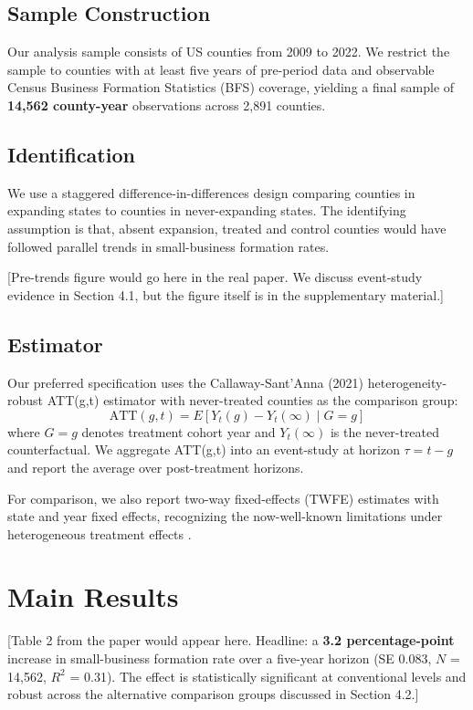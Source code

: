 \documentclass[11pt]{article}
\begin{document}
\subsection{Sample Construction}

Our analysis sample consists of US counties from 2009 to 2022. We restrict the sample to
counties with at least five years of pre-period data and observable Census Business
Formation Statistics (BFS) coverage, yielding a final sample of \textbf{14,562 county-year}
observations across 2,891 counties.

\subsection{Identification}

We use a staggered difference-in-differences design comparing counties in expanding states
to counties in never-expanding states. The identifying assumption is that, absent
expansion, treated and control counties would have followed parallel trends in
small-business formation rates.

[Pre-trends figure would go here in the real paper. We discuss event-study evidence
in Section 4.1, but the figure itself is in the supplementary material.]

\subsection{Estimator}

Our preferred specification uses the Callaway-Sant'Anna (2021) heterogeneity-robust
ATT(g,t) estimator with never-treated counties as the comparison group:
\[ \text{ATT}(g,t) = E[Y_t(g) - Y_t(\infty) \mid G = g] \]
where $G = g$ denotes treatment cohort year and $Y_t(\infty)$ is the never-treated
counterfactual. We aggregate ATT(g,t) into an event-study at horizon $\tau = t - g$
and report the average over post-treatment horizons.

For comparison, we also report two-way fixed-effects (TWFE) estimates with state and
year fixed effects, recognizing the now-well-known limitations under heterogeneous
treatment effects \citep{deChaisemartin2020,Goodmanbacon2021}.

\section{Main Results}

[Table 2 from the paper would appear here. Headline: a \textbf{3.2 percentage-point}
increase in small-business formation rate over a five-year horizon
(SE 0.083, $N$ = 14,562, $R^2$ = 0.31). The effect is statistically significant at
conventional levels and robust across the alternative comparison groups discussed
in Section 4.2.]
\end{document}
